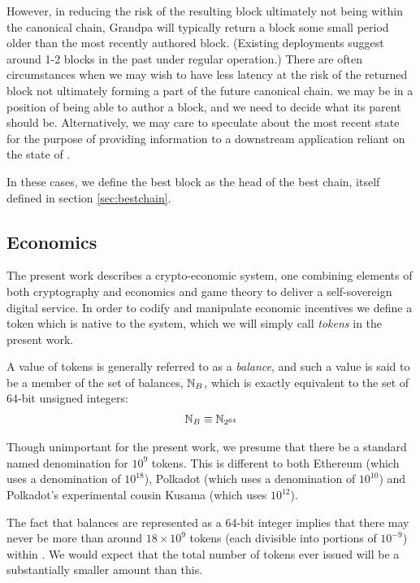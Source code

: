 However, in reducing the risk of the resulting block ultimately not being within the canonical chain, Grandpa will typically return a block some small period older than the most recently authored block. (Existing deployments suggest around 1-2 blocks in the past under regular operation.) There are often circumstances when we may wish to have less latency at the risk of the returned block not ultimately forming a part of the future canonical chain. \Eg we may be in a position of being able to author a block, and we need to decide what its parent should be. Alternatively, we may care to speculate about the most recent state for the purpose of providing information to a downstream application reliant on the state of \Jam.

In these cases, we define the best block as the head of the best chain, itself defined in section \ref{sec:bestchain}.

\subsection{Economics}

The present work describes a crypto-economic system, \ie one combining elements of both cryptography and economics and game theory to deliver a self-sovereign digital service. In order to codify and manipulate economic incentives we define a token which is native to the system, which we will simply call \emph{tokens} in the present work.

A value of tokens is generally referred to as a \emph{balance}, and such a value is said to be a member of the set of balances, $\mathbb{N}_B$, which is exactly equivalent to the set of 64-bit unsigned integers:
\begin{align}\label{eq:balance}
  \mathbb{N}_B \equiv \mathbb{N}_{2^{64}}
\end{align}

Though unimportant for the present work, we presume that there be a standard named denomination for $10^{9}$ tokens. This is different to both Ethereum (which uses a denomination of $10^{18}$), Polkadot (which uses a denomination of $10^{10}$) and Polkadot's experimental cousin Kusama (which uses $10^{12}$).

The fact that balances are represented as a 64-bit integer implies that there may never be more than around $18\times10^{9}$ tokens (each divisible into portions of $10^{-9}$) within \Jam. We would expect that the total number of tokens ever issued will be a substantially smaller amount than this.

